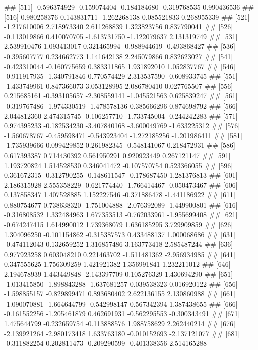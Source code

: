 \documentclass[
]{article}
\begin{document}
\begin{enumerate}[label=(\alph*)]
##  [511] -0.596374929 -0.159074404 -0.184184680 -0.319768535  0.990436536
##  [516]  0.980258376  0.143831711 -1.262268138  0.085521833  0.268955339
##  [521] -1.217610006  2.718973340  2.611268839  1.323823756  0.837790041
##  [526] -0.113019866  0.410070705 -1.613731750 -1.122079637  2.131319749
##  [531]  2.539910476  1.093413017  0.321465994 -0.988944619 -0.493868427
##  [536] -0.395607777  0.234662773  1.141642138  2.245079866  0.832623027
##  [541] -0.423310044 -0.160775659  0.383311865  1.931892010  1.052837767
##  [546] -0.911917935 -1.340791846  0.770574429  2.313537590 -0.608933745
##  [551] -1.433749961  0.847366073  3.053128995  2.086780410  0.027765507
##  [556]  0.215685161 -0.393105657 -2.308559141 -1.045521563  0.625839247
##  [561] -0.319767486 -1.974330519 -1.478578136  0.385666296  0.874698792
##  [566]  2.044812360  2.474315745 -0.106257710 -1.733745004 -0.244242283
##  [571]  0.974395233 -0.182534230 -3.407840168 -3.600049769 -1.633225312
##  [576] -1.560678767 -0.459598471 -0.543923404 -1.272185256 -1.201986411
##  [581] -1.735939666  0.099429852  0.261982345 -0.548141067  0.218472931
##  [586]  0.617393387  0.714430392  0.561950291  0.920923449  0.267121147
##  [591]  1.193720824  1.514528530  0.346041472 -0.107570754  0.523366055
##  [596]  0.361672315 -0.312790255 -0.148611547 -0.178687450  1.281376813
##  [601]  2.186315928  2.555358229 -0.621774440 -1.766414467 -0.050473467
##  [606]  0.137858347  1.407528885  1.152227546 -0.371886478 -1.441186922
##  [611]  0.880754677  0.738638320 -1.751004888 -2.076392089 -1.449900801
##  [616] -0.316808532  1.332484963  1.677353513 -0.762033961 -1.955699408
##  [621] -0.674247415  1.614990012  1.739368079  1.636185295  3.729909859
##  [626]  1.304096250 -0.101154862 -0.315387573  0.433488137  1.000068686
##  [631] -0.474112043  0.132659252  1.316857486  3.163773418  2.585487244
##  [636]  0.977923258  0.603048210  0.221463702 -1.511481362 -2.956934985
##  [641]  0.347555625  1.756309259  1.421921382  1.356991841  1.232211012
##  [646]  2.194678939  1.443449848 -2.143397709  0.105276329  1.430694290
##  [651] -1.013415850 -1.898843288 -1.637681257  0.039538323  0.016920122
##  [656] -1.598855157 -0.829899471  0.893680402  2.622136155  2.130860988
##  [661] -1.090070881 -1.664644799 -0.542998147  0.567342394  1.387438655
##  [666] -0.161552256 -1.205461879  0.462691931 -0.562295553 -0.300343491
##  [671]  1.475644799 -0.232659754 -0.113888576  1.988758629  2.262440214
##  [676] -2.139921264 -2.980173418  1.633763180 -0.010152693 -2.137121077
##  [681] -0.311882254  0.202811473 -0.209290599 -0.401338356  2.514165288

\end{enumerate}
\end{document}
